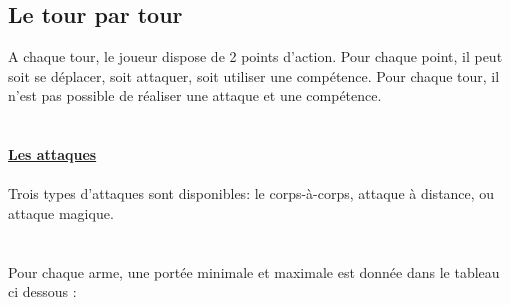\documentclass[a4paper,12pt]{report}
\begin{document}
	
	\subsection{Le tour par tour} 
	A chaque tour, le joueur dispose de 2 points d'action. Pour chaque point, il peut soit se déplacer, soit attaquer, soit utiliser une compétence. Pour chaque tour, il n'est pas possible de réaliser une attaque et une compétence. \\ \\ \\
	\textbf{\underline{Les attaques}}\\ \\
	Trois types d'attaques sont disponibles: le corps-à-corps, attaque à distance, ou attaque magique.\\ \\ \\ Pour chaque arme, une portée minimale et maximale est donnée dans le tableau ci dessous : \\ \\ \\
	
	
	
\end{document}
